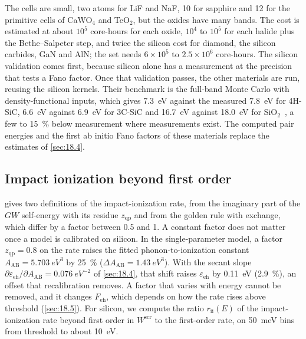 The cells are small, two atoms for LiF and NaF, 10 for sapphire and 12 for the primitive cells of CaWO$_4$ and TeO$_2$, but the oxides have many bands. The cost is estimated at about $10^5$ core-hours for each oxide, $10^4$ to $10^5$ for each halide plus the Bethe--Salpeter step, and twice the silicon cost for diamond, the silicon carbides, GaN and AlN; the set needs $6\times10^5$ to $2.5\times10^6$ core-hours. The silicon validation comes first, because silicon alone has a measurement at the precision that tests a Fano factor. Once that validation passes, the other materials are run, reusing the silicon kernels. Their benchmark is the full-band Monte Carlo with density-functional inputs, which gives \SI{7.3}{eV} against the measured \SI{7.8}{eV} for 4H-SiC, \SI{6.6}{eV} against \SI{6.9}{eV} for 3C-SiC and \SI{16.7}{eV} against \SI{18.0}{eV} for SiO$_2$~\cite[Table~II]{nielsen2026first}, a few to \SI{15}{\percent} below measurement where measurements exist. The computed pair energies and the first ab initio Fano factors of these materials replace the estimates of \cref{sec:18.4}.

\subsection{Impact ionization beyond first order}

 gives two definitions of the impact-ionization rate, from the imaginary part of the $GW$ self-energy with its residue $z_{\mathrm{qp}}$ and from the golden rule with exchange, which differ by a factor between 0.5 and 1. A constant factor does not matter once a model is calibrated on silicon. In the single-parameter model, a factor $z_{\mathrm{qp}} = 0.8$ on the rate raises the fitted phonon-to-ionization constant $A_{\mathrm{AB}} = \SI{5.703}{eV^3}$ by \SI{25}{\percent} ($\Delta A_{\mathrm{AB}} = \SI{1.43}{eV^3}$). With the secant slope $\partial\varepsilon_{\mathrm{eh}}/\partial A_{\mathrm{AB}} = \SI{0.076}{eV^{-2}}$ of \cref{sec:18.4}, that shift raises $\varepsilon_{\mathrm{eh}}$ by \SI{0.11}{eV} (\SI{2.9}{\percent}), an offset that recalibration removes. A factor that varies with energy cannot be removed, and it changes $F_{\mathrm{eh}}$, which depends on how the rate rises above threshold (\cref{sec:18.5}). For silicon, we compute the ratio $r_{\mathrm{ii}}(E)$ of the impact-ionization rate beyond first order in $W^{\mathrm{scr}}$ to the first-order rate, on \SI{50}{meV} bins from threshold to about \SI{10}{eV}.


